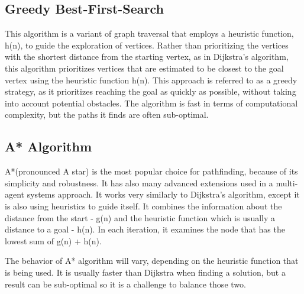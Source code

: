 \subsection{Greedy Best-First-Search}
This algorithm is a variant of graph traversal that employs a heuristic function, h(n), to guide the exploration of vertices. Rather than prioritizing the vertices with the shortest distance from the starting vertex, as in Dijkstra's algorithm, this algorithm prioritizes vertices that are estimated to be closest to the goal vertex using the heuristic function h(n). This approach is referred to as a greedy strategy, as it prioritizes reaching the goal as quickly as possible, without taking into account potential obstacles. The algorithm is fast in terms of computational complexity, but the paths it finds are often sub-optimal.

\subsection{A* Algorithm}
A*(pronounced A star) is the most popular choice for pathfinding, because of its simplicity and robustness. It has also many advanced extensions used in a multi-agent systems approach. It works very similarly to Dijkstra's algorithm, except it is also using heuristics to guide itself. It combines the information about the distance from the start - g(n) and the heuristic function which is usually a distance to a goal - h(n). In each iteration, it examines the node that has the lowest sum of g(n) + h(n)\cite{basic_2}.

The behavior of A* algorithm will vary, depending on the heuristic function that is being used. It is usually faster than Dijkstra when finding a solution, but a result can be sub-optimal so it is a challenge to balance those two.
